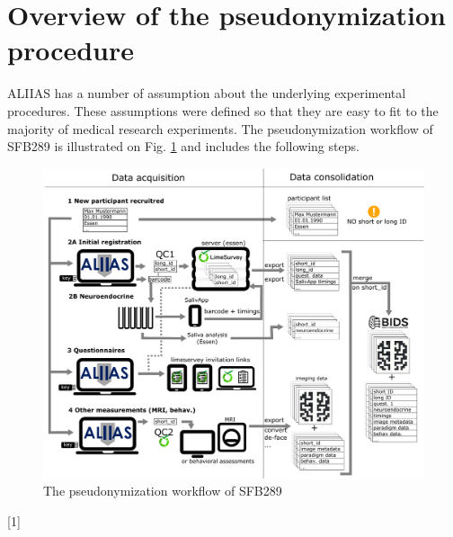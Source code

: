 \section{Overview of the pseudonymization procedure}
\label{section:overview}
ALIIAS has a number of assumption about the underlying experimental procedures. These assumptions were defined so that they are easy to fit to the majority of medical research experiments. The pseudonymization workflow of SFB289 is illustrated on Fig. \ref{fig:flowchart} and includes the following steps.

\begin{figure}[H]
\centering
\includegraphics[width=1.0\textwidth]{docs/fig/overview_v3.eps}
\caption{The pseudonymization workflow of SFB289}
\label{fig:flowchart}
\end{figure}

[1]

